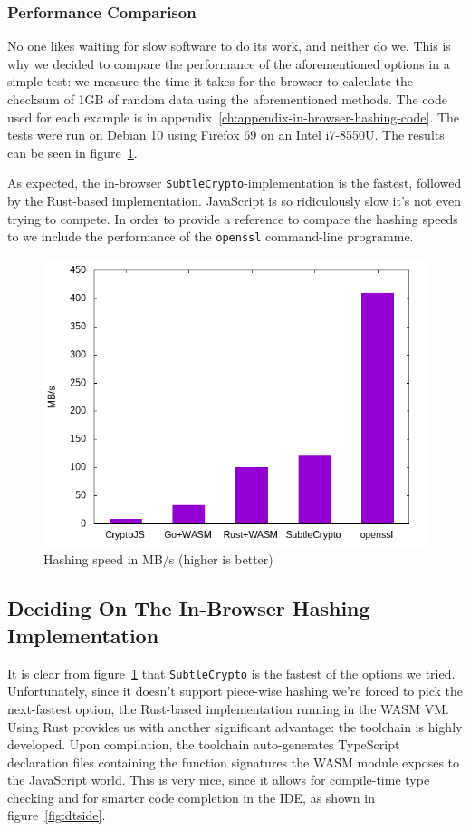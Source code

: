\subsubsection{Performance Comparison}
\label{subsec:perfcomphashing}
No one likes waiting for slow software to do its work, and neither do we.
This is why we decided to compare the performance of the aforementioned options in a simple test:
we measure the time it takes for the browser to calculate the checksum of 1GB of random data using the aforementioned methods.
The code used for each example is in appendix~\ref{ch:appendix-in-browser-hashing-code}.
The tests were run on Debian 10 using Firefox 69 on an Intel i7-8550U.
The results can be seen in figure~\ref{fig:hashingperformance}.

As expected, the in-browser \texttt{SubtleCrypto}-implementation is the fastest, followed by the Rust-based implementation.
JavaScript is so ridiculously slow it's not even trying to compete.
In order to provide a reference to compare the hashing speeds to we include the performance of the \texttt{openssl} command-line programme.

\begin{figure}
    \begin{center}
        \includegraphics[width=0.7\linewidth]{images/hashingperformance.png}
        \caption{Hashing speed in MB/s (higher is better)}
        \label{fig:hashingperformance}
    \end{center}
\end{figure}


\subsection{Deciding On The In-Browser Hashing Implementation}
\label{subsec:deciding-on-the-in-browser-hashing-implementation}
It is clear from figure~\ref{fig:hashingperformance} that \texttt{SubtleCrypto} is the fastest of the options we tried.
Unfortunately, since it doesn't support piece-wise hashing we're forced to pick the next-fastest option,
the Rust-based implementation running in the \gls{WASM} \gls{VM}.
Using Rust provides us with another significant advantage:
the toolchain is highly developed.
Upon compilation, the toolchain auto-generates TypeScript declaration files containing the function signatures
the \gls{WASM} module exposes to the JavaScript world.
This is very nice, since it allows for compile-time type checking and for smarter code completion in the \gls{IDE},
as shown in figure~\ref{fig:dtside}.

